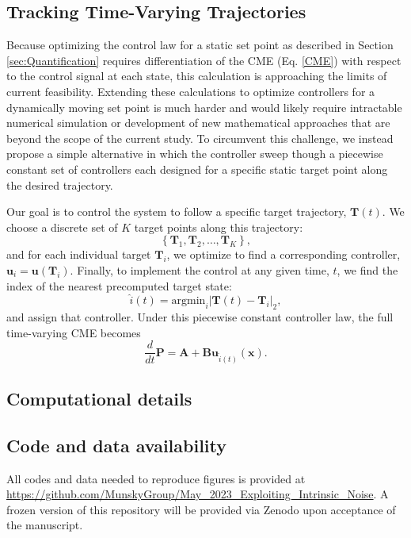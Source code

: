 \documentclass[12pt]{iopart}
\begin{document}
\subsection{Tracking Time-Varying Trajectories}\label{sec:Dynamic}
Because optimizing the control law for a static set point as described in Section \ref{sec:Quantification} requires differentiation of the CME (Eq. \ref{CME}) with respect to the control signal at each state, this calculation is approaching the limits of current feasibility.
Extending these calculations to optimize controllers for a dynamically moving set point is much harder and would likely require intractable numerical simulation or development of new mathematical approaches that are beyond the scope of the current study. 
To circumvent this challenge, we instead propose a simple alternative in which the controller sweep though a piecewise constant set of controllers each designed for a specific static target point along the desired trajectory.

Our goal is to control the system to follow a specific target trajectory, $\mathbf{T}(t)$. We choose a discrete set of $K$ target points along this trajectory:
\begin{equation}
\left\{\mathbf{T}_1,\mathbf{T}_2,\ldots,\mathbf{T}_K\right\},
\end{equation}
and for each individual target $\mathbf{T}_i$, we optimize to find a corresponding controller, $\mathbf{u}_i=\mathbf{u}(\mathbf{T}_i)$. Finally, to implement the control at any given time, $t$, we find the index of the nearest precomputed target state:
\begin{equation}
\hat{i}(t) = \textrm{argmin}_i \left| \mathbf{T}(t) -  \mathbf{T}_i\right|_2,
\end{equation}
and assign that controller.
Under this piecewise constant controller law, the full time-varying CME becomes
\begin{equation}
\frac{d}{dt}\mathbf{P}=\mathbf{A}+\mathbf{B}\mathbf{u}_{\hat{i}(t)}(\mathbf{x}).
\end{equation}

\subsection{Computational details}

\subsection{Code and data availability}
All codes and data needed to reproduce figures is provided at \url{https://github.com/MunskyGroup/May_2023_Exploiting_Intrinsic_Noise}.  A frozen version of this repository will be provided via Zenodo upon acceptance of the manuscript.
\end{document}
